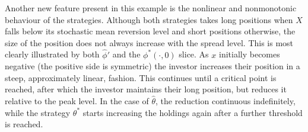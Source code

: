\documentclass{article}
\theoremstyle{plain}
\theoremstyle{definition}
\numberwithin{lem}{section}
\begin{document}
Another new feature present in this example is the nonlinear and nonmonotonic behaviour of the strategies. Although both strategies takes long positions when $X$ falls below its stochastic mean reversion level and short positions otherwise, the size of the position does not always increase with the spread level. This is most clearly illustrated by both $\widehat \phi'$ and the $\phi^*(\cdot,0)$ slice. As $x$ initially becomes negative (the positive side is symmetric) the investor increases their position in a steep, approximately linear, fashion. This continues until a critical point is reached, after which the investor maintains their long position, but reduces it relative to the peak level. In the case of $\widehat \theta$, the reduction continuous indefinitely, while the strategy $\theta^*$ starts increasing the holdings again after a further threshold is reached. 
\end{document}
